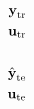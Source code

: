 \documentclass[10pt]{article}
\begin{document}
\begin{align*}\textbf{y}_{\rm tr}\\
\textbf{u}_{\rm tr}\\
\\
\hat{\textbf{y}}_{\rm te}\\
\textbf{u}_{\rm te}\end{align*}
\end{document}
